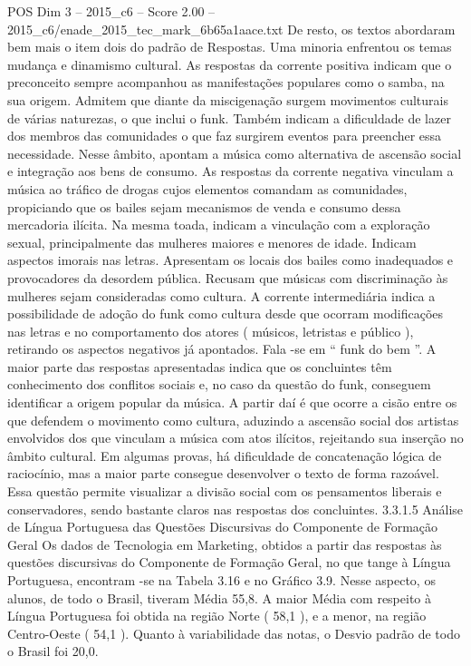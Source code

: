 \begin{textsample}{POS Dim 3 – 2015\_c6 – Score 2.00 – 2015\_c6/enade\_2015\_tec\_mark\_6b65a1aace.txt}
De resto, os textos abordaram bem mais o item dois do padrão de Respostas.
Uma minoria enfrentou os temas mudança e dinamismo cultural.
As respostas da corrente positiva indicam que o preconceito sempre acompanhou as manifestações populares como o samba, na sua origem.
Admitem que diante da miscigenação surgem movimentos culturais de várias naturezas, o que inclui o funk.
Também indicam a dificuldade de lazer dos membros das comunidades o que faz surgirem eventos para preencher essa necessidade.
Nesse âmbito, apontam a música como alternativa de ascensão social e integração aos bens de consumo.
As respostas da corrente negativa vinculam a música ao tráfico de drogas cujos elementos comandam as comunidades, propiciando que os bailes sejam mecanismos de venda e consumo dessa mercadoria ilícita.
Na mesma toada, indicam a vinculação com a exploração sexual, principalmente das mulheres maiores e menores de idade.
Indicam aspectos imorais nas letras.
Apresentam os locais dos bailes como inadequados e provocadores da desordem pública.
Recusam que músicas com discriminação às mulheres sejam consideradas como cultura.
A corrente intermediária indica a possibilidade de adoção do funk como cultura desde que ocorram modificações nas letras e no comportamento dos atores ( músicos, letristas e público ), retirando os aspectos negativos já apontados.
Fala -se em “ funk do bem ”.
A maior parte das respostas apresentadas indica que os concluintes têm conhecimento dos conflitos sociais e, no caso da questão do funk, conseguem identificar a origem popular da música.
A partir daí é que ocorre a cisão entre os que defendem o movimento como cultura, aduzindo a ascensão social dos artistas envolvidos dos que vinculam a música com atos ilícitos, rejeitando sua inserção no âmbito cultural.
Em algumas provas, há dificuldade de concatenação lógica de raciocínio, mas a maior parte consegue desenvolver o texto de forma razoável.
Essa questão permite visualizar a divisão social com os pensamentos liberais e conservadores, sendo bastante claros nas respostas dos concluintes. 3.3.1.5 Análise de Língua Portuguesa das Questões Discursivas do Componente de Formação Geral Os dados de Tecnologia em Marketing, obtidos a partir das respostas às questões discursivas do Componente de Formação Geral, no que tange à Língua Portuguesa, encontram -se na Tabela 3.16 e no Gráfico 3.9.
Nesse aspecto, os alunos, de todo o Brasil, tiveram Média 55,8.
A maior Média com respeito à Língua Portuguesa foi obtida na região Norte ( 58,1 ), e a menor, na região Centro-Oeste ( 54,1 ).
Quanto à variabilidade das notas, o Desvio padrão de todo o Brasil foi 20,0.

\end{textsample}
